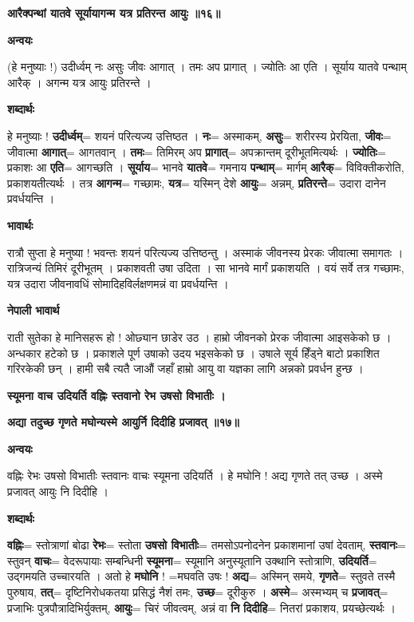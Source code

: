\documentclass[11pt, a5paper]{article}
\begin{document}
\textbf{आरैक्पन्थां यातवे सूर्यायागन्म यत्र प्रतिरन्त आयुः ॥१६॥}

\textbf{अन्वयः}

(हे मनुष्याः !) उदीर्ध्वम् नः असुः जीवः आगात् । तमः अप प्रागात् । ज्योतिः आ एति । सूर्याय यातवे पन्थाम् आरैक् । अगन्म यत्र आयुः प्रतिरन्ते ।

\textbf{शब्दार्थः}

हे मनुष्याः ! \textbf{उदीर्ध्वम्}= शयनं परित्यज्य उत्तिष्ठत । \textbf{नः}= अस्माकम्, \textbf{असुः}= शरीरस्य प्रेरयिता, \textbf{जीवः}= जीवात्मा \textbf{आगात्}= आगतवान् । \textbf{तमः}= तिमिरम् अप \textbf{प्रागात्}= अपक्रान्तम्  दूरीभूतमित्यर्थः । \textbf{ज्योतिः}= प्रकाशः आ \textbf{एति}= आगच्छति । \textbf{सूर्याय}= भानवे \textbf{यातवे}= गमनाय \textbf{पन्थाम्}= मार्गम् \textbf{आरैक्}= विविक्तीकरोति, प्रकाशयतीत्यर्थः । तत्र \textbf{आगन्म}= गच्छामः, \textbf{यत्र}= यस्मिन् देशे \textbf{आयुः}= अन्नम्, \textbf{प्रतिरन्ते}= उदारा दानेन प्रवर्धयन्ति ।

\textbf{भावार्थः}

रात्रौ सुप्ता हे मनुष्या ! भवन्तः शयनं परित्यज्य उत्तिष्ठन्तु । अस्माकं जीवनस्य प्रेरकः जीवात्मा समागतः । रात्रिजन्यं तिमिरं दूरीभूतम् । प्रकाशवती उषा उदिता । सा भानवे मार्गं प्रकाशयति । वयं सर्वे तत्र गच्छामः, यत्र उदारा जीवनावधिं सोमादिहविर्लक्षणमन्नं वा प्रवर्धयन्ति ।

\textbf{नेपाली भावार्थ}

राती सुतेका हे मानिसहरू हो ! ओछ्यान छाडेर उठ । हाम्रो जीवनको प्रेरक जीवात्मा आइसकेको छ । अन्धकार हटेको छ । प्रकाशले पूर्ण उषाको उदय भइसकेको छ । उषाले सूर्य हिँड्ने बाटो प्रकाशित गरिरकेकी छन् । हामी सबै त्यतै जाऔं जहाँ हाम्रो आयु वा यज्ञका लागि अन्नको प्रवर्धन हुन्छ ।

\textbf{स्यूमना वाच उदियर्ति वह्निः स्तवानो रेभ उषसो विभातीः ।}

\textbf{अद्या तदुच्छ गृणते मघोन्यस्मे आयुर्नि दिदीहि प्रजावत् ॥१७॥}

\textbf{अन्वयः}

वह्निः रेभः उषसो विभातीः स्तवानः वाचः स्यूमना उदियर्ति । हे मघोनि ! अद्य गृणते तत् उच्छ । अस्मे प्रजावत् आयुः नि दिदीहि ।

\textbf{शब्दार्थः}

\textbf{वह्निः}= स्तोत्राणां बोढा \textbf{रेभः}= स्तोता \textbf{उषसो विभातीः}= तमसोऽपनोदनेन प्रकाशमानां उषां देवताम्, \textbf{स्तवानः}= स्तुवन् \textbf{वाचः}= वेदरूपायाः सम्बन्धिनी \textbf{स्यूमना}= स्यूमानि अनुस्यूतानि उक्थानि स्तोत्राणि, \textbf{उदियर्ति}= उद्गमयति उच्चारयति । अतो हे \textbf{मघोनि} ! =मघवति उषः ! \textbf{अद्य}= अस्मिन् समये, \textbf{गृणते}= स्तुवते तस्मै पुरुषाय, \textbf{तत्}= दृष्टिनिरोधकतया प्रसिद्धं नैशं तमः, \textbf{उच्छ}= दूरीकुरु ।  \textbf{अस्मे}= अस्मभ्यम् च \textbf{प्रजावत्}= प्रजाभिः पुत्रपौत्रादिभिर्युक्तम्, \textbf{आयुः}= चिरं जीवत्वम्, अन्नं वा \textbf{नि} \textbf{दिदीहि}= नितरां प्रकाशय, प्रयच्छेत्यर्थः ।
\end{document}
